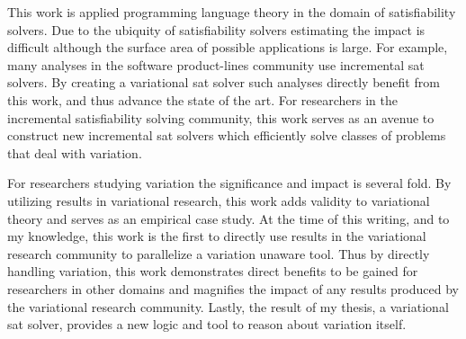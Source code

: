 This work is applied programming language theory in the domain of satisfiability
solvers. Due to the ubiquity of satisfiability solvers estimating the impact is
difficult although the surface area of possible applications is large. For
example, many analyses in the software product-lines community use incremental
\ac{sat} solvers. By creating a variational \ac{sat} solver such analyses
directly benefit from this work, and thus advance the state of the art. For
researchers in the incremental satisfiability solving community, this work
serves as an avenue to construct new incremental \ac{sat} solvers which
efficiently solve classes of problems that deal with variation.

For researchers studying variation the significance and impact is several fold.
By utilizing results in variational research, this work adds validity to
variational theory and serves as an empirical case study. At the time of this
writing, and to my knowledge, this work is the first to directly use results in
the variational research community to parallelize a variation unaware tool. Thus
by directly handling variation, this work demonstrates direct benefits to be
gained for researchers in other domains and magnifies the impact of any results
produced by the variational research community. Lastly, the result of my thesis,
a variational \ac{sat} solver, provides a new logic and tool to reason about
variation itself.

